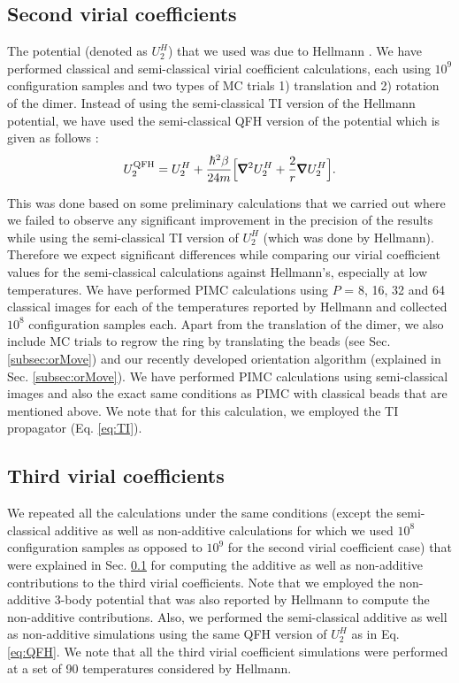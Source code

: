     \subsection{Second virial coefficients}
    \label{subsubsec:b2n2}
        The \abinitio{} potential (denoted as $U_2^H$) that we used was due to Hellmann \cite{Hellmann2013}. We have performed classical and semi-classical virial coefficient calculations, each using $10^9$ configuration samples and two types of MC trials 1) translation and 2) rotation of the dimer. Instead of using the semi-classical TI version of the Hellmann potential, we have used the semi-classical QFH version of the potential which is given as follows \cite{Feynman,Schenter2002}:
        \begin{equation}
        \label{eq:QFH}
            U_2^{\rm QFH} = U_2^H + \displaystyle\frac{\hbar^2 \beta}{24 m} \Big[ \pmb{\nabla}^2 U_2^H + \frac{2}{r} \pmb{\nabla} U_2^H \Big].
        \end{equation}

        This was done based on some preliminary calculations that we carried out where we failed to observe any significant improvement in the precision of the results while using the semi-classical TI version of $U_2^H$ (which was done by Hellmann). Therefore we expect significant differences while comparing our virial coefficient values for the semi-classical calculations against Hellmann's, especially at low temperatures. We have performed PIMC calculations using $P$ = 8, 16, 32 and 64 classical images for each of the temperatures reported by Hellmann and collected $10^8$ configuration samples each. Apart from the translation of the dimer, we also include MC trials to regrow the ring by translating the beads (see Sec. \ref{subsec:orMove}) and our recently developed orientation algorithm \cite{hydrogen} (explained in Sec. \ref{subsec:orMove}). We have performed PIMC calculations using semi-classical images and also the exact same conditions as PIMC with classical beads that are mentioned above. We note that for this calculation, we employed the TI propagator (Eq. \eqref{eq:TI}).

    \subsection{Third virial coefficients}
        We repeated all the calculations under the same conditions (except the semi-classical additive as well as non-additive calculations for which we used $10^8$ configuration samples as opposed to $10^9$ for the second virial coefficient case) that were explained in Sec. \ref{subsubsec:b2n2} for computing the additive as well as non-additive contributions to the third virial coefficients. Note that we employed the non-additive 3-body potential that was also reported by Hellmann \cite{Hellmann2013} to compute the non-additive contributions. Also, we performed the semi-classical additive as well as non-additive simulations using the same QFH version of $U_2^H$ as in Eq. \eqref{eq:QFH}. We note that all the third virial coefficient simulations were performed at a set of 90 temperatures considered by Hellmann.
